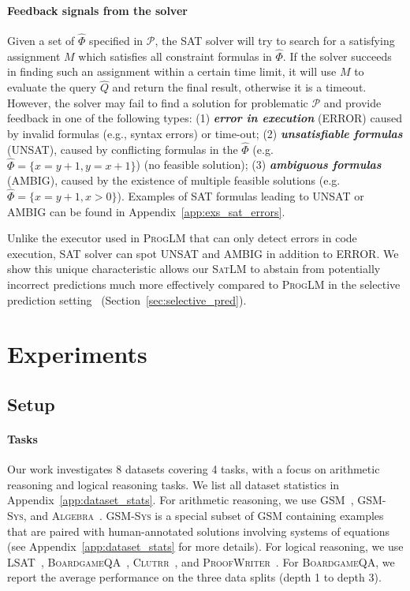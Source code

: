 \documentclass{article}
\theoremstyle{definition}
\newcommand{\satprob}{\mathcal{P}}
\newcommand{\gsm}{\textsc{GSM}}
\newcommand{\spec}{\Phi}
\newcommand{\query}{Q}
\newcommand{\gsmsys}{\textsc{GSM-Sys}}
\newcommand{\algebra}{\textsc{Algebra}}
\newcommand{\lsat}{\textsc{LSAT}}
\newcommand{\clutrr}{\textsc{Clutrr}}
\newcommand{\proofwriter}{\textsc{ProofWriter}}
\newcommand{\boardgame}{\textsc{BoardgameQA}}
\newcommand{\satlm}{\textsc{SatLM}}
\newcommand{\pallm}{\textsc{ProgLM}}
\begin{document}
\paragraph{Feedback signals from the solver}
Given a set of $\hat{\spec}$ specified in $\satprob$, the SAT solver will try to search for a satisfying assignment $M$ which satisfies all constraint formulas in $\hat{\spec}$.  If the solver succeeds in finding such an assignment within a certain time limit, it will use $M$ to evaluate the query $\hat{\query}$ and return the final result, otherwise it is a timeout. However, the solver may fail to find a solution for problematic $\satprob$ and provide feedback in one of the following types: (1) 
\textbf{\emph{error in execution}} ({\small ERROR}) caused by invalid formulas (e.g., syntax errors) or time-out;  (2) \textbf{\emph{unsatisfiable formulas}} ({\small UNSAT}), caused by conflicting formulas in the $\hat{\spec}$ (e.g. $\hat{\spec}=\{x=y+1,y=x+1\}$) (no feasible solution); (3) \textbf{\emph{ambiguous formulas}} ({\small AMBIG}), caused by the existence of multiple feasible solutions (e.g. $\hat{\spec}=\{x=y+1,x>0\}$). 
 Examples of SAT formulas leading to  {\small UNSAT} or  {\small AMBIG} can be found in Appendix~\ref{app:exs_sat_errors}.
 
Unlike the executor used in \pallm{} that can only detect errors in code execution, SAT solver can spot  {\small UNSAT} and  {\small AMBIG} in addition to  {\small ERROR}. We show this unique characteristic allows our \satlm{} to abstain from potentially incorrect predictions much more effectively compared to \pallm{} 
 in the selective prediction setting~\citep{selectivesetting} (Section~\ref{sec:selective_pred}).




\section{Experiments}
\subsection{Setup}
\label{sec:setup}
\paragraph{Tasks} Our work investigates 8 datasets covering 4 tasks, with a focus on arithmetic reasoning and logical reasoning tasks. We list all dataset statistics in Appendix~\ref{app:dataset_stats}. For arithmetic reasoning, we use \gsm{}~\citep{gsm8k}, \gsmsys{}, and \algebra{}~\citep{gsmsat}. \gsmsys{} is a special subset of \gsm{} containing examples that are paired with human-annotated solutions involving systems of equations (see Appendix~\ref{app:dataset_stats} for more details). For logical reasoning, we use \lsat{}~\citep{arlsat}, \boardgame{}~\citep{boardgameqa}, \clutrr{}~\citep{clutrr}, and \proofwriter{}~\citep{proofwriter}.
For \boardgame{}, we report the average performance on the three data splits (depth 1 to depth 3).
\end{document}
